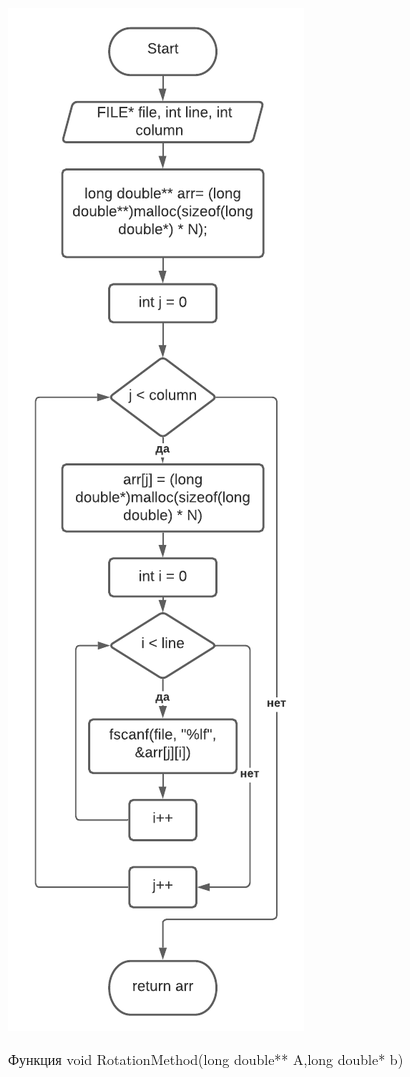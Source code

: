 \includegraphics[scale=0.5]{block1.pdf}

Функция void RotationMethod(long double** A,long double* b)

